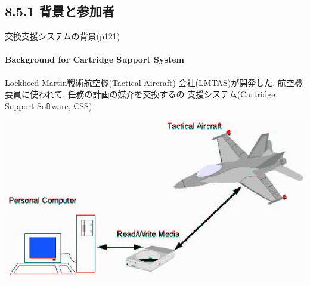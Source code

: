 \subsection{8.5.1 背景と参加者}
\begin{frame}{交換支援システムの背景(p121)}
\framesubtitle{Background for Cartridge Support System}
Lockheed Martin戦術航空機(Tactical Aircraft)
会社(LMTAS)が開発した, 航空機要員に使われて, 任務の計画の媒介を交換するの
支援システム(Cartridge Support Software, CSS)
\begin{center}
\includegraphics[width=\textwidth,height=0.5\textheight,keepaspectratio]{figure/CSS.png}
\end{center}
\end{frame}
